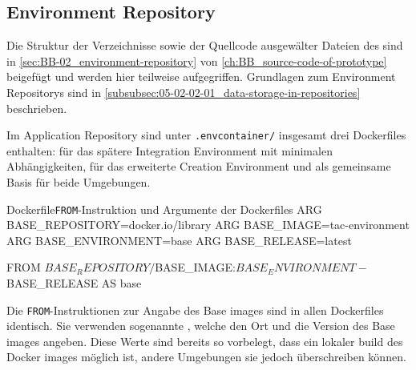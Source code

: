 
\subsection{Environment Repository}
\label{subsec:06-02-02_environment-repository}

Die Struktur der Verzeichnisse sowie der Quellcode ausgewälter Dateien des  sind in \autoref{sec:BB-02_environment-repository} von \autoref{ch:BB_source-code-of-prototype} beigefügt und werden hier teilweise aufgegriffen. Grundlagen zum Environment Repositorys sind in \autoref{subsubsec:05-02-02-01_data-storage-in-repositories} beschrieben.

Im Application Repository sind unter \texttt{.envcontainer/} insgesamt drei Dockerfiles enthalten:  für das spätere Integration Environment mit minimalen Abhängigkeiten,  für das erweiterte Creation Environment und  als gemeinsame Basis für beide Umgebungen.

\begin{codebox}{Dockerfile}{\texttt{FROM}-Instruktion und Argumente der Dockerfiles}
ARG BASE_REPOSITORY=docker.io/library
ARG BASE_IMAGE=tac-environment
ARG BASE_ENVIRONMENT=base
ARG BASE_RELEASE=latest

FROM ${BASE_REPOSITORY}/${BASE_IMAGE}:${BASE_ENVIRONMENT}-${BASE_RELEASE} AS base
\end{codebox}

Die \texttt{FROM}-Instruktionen zur Angabe des Base \Glspl{image} sind in allen Dockerfiles identisch. Sie verwenden sogenannte , welche den Ort und die Version des Base \Glspl{image} angeben. Diese Werte sind bereits so vorbelegt, dass ein lokaler \Gls{build} des Docker \Glspl{image} möglich ist, andere Umgebungen sie jedoch überschreiben können.

